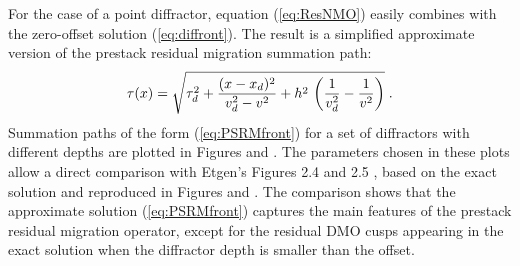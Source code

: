 For the case of a point diffractor, equation (\ref{eq:ResNMO}) easily
combines with the zero-offset solution (\ref{eq:diffront}). The result
is a simplified approximate version of the prestack residual migration
summation path:
\begin{equation}
\tau(x)=\sqrt{\tau_d^2 + 
{{(x - x_d)^2} \over {v_d^2 - v^2}} +
h^2\,\left({1 \over v_d^2} - {1 \over v^2}\right)}\;.
\label{eq:PSRMfront}
\end{equation}
Summation paths of the form (\ref{eq:PSRMfront}) for a set of diffractors
with different depths are plotted in Figures  and
. The parameters chosen in these plots allow a direct
comparison with Etgen's Figures 2.4 and 2.5 \cite[]{Etgen.sepphd.68},
based on the exact solution and reproduced in Figures  and
. The comparison shows that the approximate
solution (\ref{eq:PSRMfront}) captures the main features of the prestack
residual migration operator, except for the residual DMO cusps
appearing in the exact solution when the diffractor depth is smaller
than the offset.



